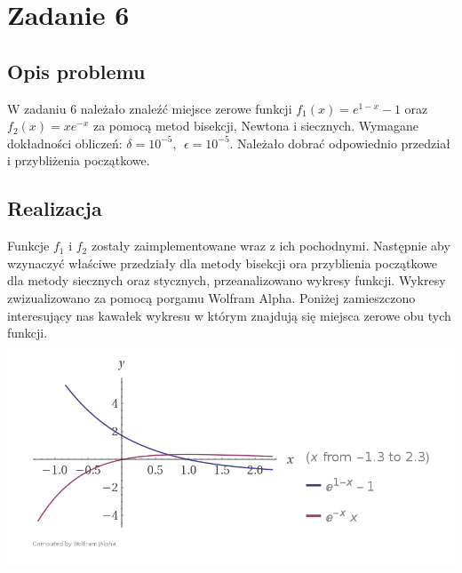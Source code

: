 \documentclass[]{article}
\begin{document}
\section{Zadanie 6}
\subsection{Opis problemu}
W zadaniu 6 należało znaleźć miejsce zerowe funkcji $f_1(x) = e^{1-x}-1$ oraz $f_2(x) = xe^{-x}$ za pomocą metod bisekcji, Newtona i siecznych. Wymagane dokładności obliczeń: $\delta = 10^{-5}, \:\: \epsilon = 10^{-5}$. Należało dobrać odpowiednio przedział i przybliżenia początkowe.
\subsection{Realizacja}
Funkcje $f_1$ i $f_2$ zostały zaimplementowane wraz z ich pochodnymi. Następnie aby wzynaczyć właściwe przedziały dla metody bisekcji ora przyblienia początkowe dla metody siecznych oraz stycznych, przeanalizowano wykresy funkcji. Wykresy zwizualizowano za pomocą porgamu Wolfram Alpha. Poniżej zamieszczono interesujący nas kawałek wykresu w którym znajdują się miejsca zerowe obu tych funkcji.  
\\
\includegraphics[scale =0.5]{plot2}
\end{document}
